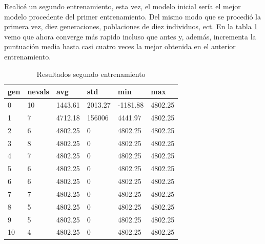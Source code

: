 Realicé un segundo entrenamiento, esta vez, el modelo inicial sería el mejor modelo procedente del primer entrenamiento. Del mismo modo que se procedió la primera vez, diez generaciones, poblaciones de diez individuos, ect. En la tabla \ref{result_segundo_entr} vemo que ahora converge más rapido incluso que antes y, además, incrementa la puntuación media hasta casi cuatro veces la mejor obtenida en el anterior entrenamiento.

\begin{table}[]
\centering
\begin{tabular}{|l|l|l|l|l|l|}
\hline
\rowcolor[HTML]{C0C0C0} 
gen & nevals & avg     & std     & min      & max     \\ \hline
0   & 10     & 1443.61 & 2013.27 & -1181.88 & 4802.25 \\ \hline
1   & 7      & 4712.18 & 156006  & 4441.97  & 4802.25 \\ \hline
2   & 6      & 4802.25 & 0       & 4802.25  & 4802.25 \\ \hline
3   & 8      & 4802.25 & 0       & 4802.25  & 4802.25 \\ \hline
4   & 7      & 4802.25 & 0       & 4802.25  & 4802.25 \\ \hline
5   & 6      & 4802.25 & 0       & 4802.25  & 4802.25 \\ \hline
6   & 6      & 4802.25 & 0       & 4802.25  & 4802.25 \\ \hline
7   & 7      & 4802.25 & 0       & 4802.25  & 4802.25 \\ \hline
8   & 5      & 4802.25 & 0       & 4802.25  & 4802.25 \\ \hline
9   & 5      & 4802.25 & 0       & 4802.25  & 4802.25 \\ \hline
10  & 4      & 4802.25 & 0       & 4802.25  & 4802.25 \\ \hline
\end{tabular}
\caption{Resultados segundo entrenamiento}
\label{result_segundo_entr}
\end{table}